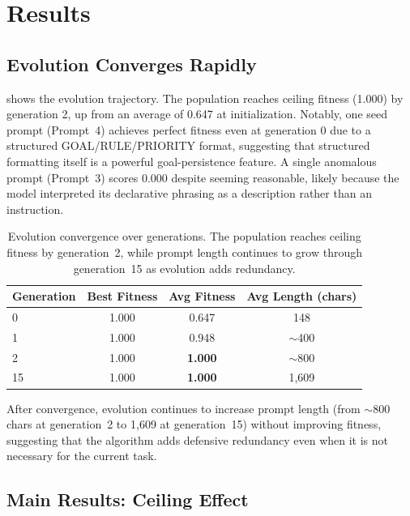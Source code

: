 \section{Results}
\label{sec:results}

\subsection{Evolution Converges Rapidly}
\label{sec:convergence}

 shows the evolution trajectory.
The population reaches ceiling fitness (1.000) by generation 2, up from an average of 0.647 at initialization.
Notably, one seed prompt (Prompt~4) achieves perfect fitness even at generation 0 due to a structured GOAL/RULE/PRIORITY format, suggesting that structured formatting itself is a powerful goal-persistence feature.
A single anomalous prompt (Prompt~3) scores 0.000 despite seeming reasonable, likely because the model interpreted its declarative phrasing as a description rather than an instruction.

\begin{table}[t]
    \centering
    \begin{tabular}{@{}lccc@{}}
        \toprule
        Generation & Best Fitness & Avg Fitness & Avg Length (chars) \\
        \midrule
        0   & 1.000 & 0.647 & 148 \\
        1   & 1.000 & 0.948 & $\sim$400 \\
        2   & 1.000 & {\bf 1.000} & $\sim$800 \\
        15  & 1.000 & {\bf 1.000} & 1{,}609 \\
        \bottomrule
    \end{tabular}
    \caption{Evolution convergence over generations.
    The population reaches ceiling fitness by generation~2, while prompt length continues to grow through generation~15 as evolution adds redundancy.}
    \label{tab:convergence}
\end{table}

After convergence, evolution continues to increase prompt length (from $\sim$800 chars at generation~2 to 1{,}609 at generation~15) without improving fitness, suggesting that the algorithm adds defensive redundancy even when it is not necessary for the current task.

\subsection{Main Results: Ceiling Effect}
\label{sec:main_results}

